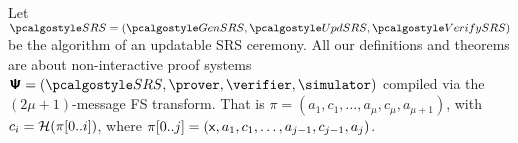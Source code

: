 Let $\SRScer= (\kgen,\upd, \verifyCRS)$ be the algorithm of an updatable SRS ceremony.
All our definitions and theorems are about non-interactive proof systems $\ps = (\SRScer, \prover, \verifier, \simulator)$ compiled via the $(2\mu + 1)$-message FS transform. 
%
That is $\pi = (a_1, c_1, \ldots, a_{\mu}, c_{\mu}, a_{\mu + 1})$, with $c_i
= \mathcal{H}(\pi[0..i])$, where $\pi[0..j] = (\mathsf{x}, a_1, c_1, \ldots,
a_{j - 1}, c_{j - 1}, a_j)$.

%
